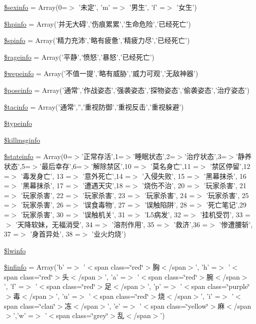 \begin{DoxyCompactItemize}
\item 
\hyperlink{resources__1_8php_a7fc213b5009edd4913f9a3f66776c721}{\$sexinfo} = Array(0=$>$ '未定', 'm' =$>$ '男生', 'f' =$>$ '女生')
\item 
\hyperlink{resources__1_8php_a6f91f38ee66d31d99255d9dc86032980}{\$hpinfo} = Array('并无大碍','伤痕累累','生命危险','已经死亡')
\item 
\hyperlink{resources__1_8php_a79b3890cc1a3fac35858fb155b285743}{\$spinfo} = Array('精力充沛','略有疲惫','精疲力尽','已经死亡')
\item 
\hyperlink{resources__1_8php_a5f383706ecfe4033fc5ba410b5efe3a0}{\$rageinfo} = Array('平静','愤怒','暴怒','已经死亡')
\item 
\hyperlink{resources__1_8php_a24d2c967a140f9ff99ba082c9353f696}{\$wepeinfo} = Array('不值一提','略有威胁','威力可观','无敌神器')
\item 
\hyperlink{resources__1_8php_af6cbbc5cff2f1db3093587d7495600ae}{\$poseinfo} = Array('通常','作战姿态','强袭姿态','探物姿态','偷袭姿态','治疗姿态')
\item 
\hyperlink{resources__1_8php_aed45c4ff2bc7ce0af6c4b05414cd1373}{\$tacinfo} = Array('通常','','重视防御','重视反击','重视躲避')
\item 
\hyperlink{resources__1_8php_afeaf726d0642146d7bf10c04e2c99075}{\$typeinfo}
\item 
\hyperlink{resources__1_8php_acfdab9efcdacf2869477a5e833712b40}{\$killmsginfo}
\item 
\hyperlink{resources__1_8php_a014f40ed69f3ce2bd7a3263f5b5c9d91}{\$stateinfo} = Array(0=$>$'正常存活',1=$>$'睡眠状态',2=$>$'治疗状态',3=$>$'静养状态',5=$>$'最后幸存',6=$>$'解除禁区',10 =$>$ '莫名身亡',11 =$>$ '禁区停留',12 =$>$ '毒发身亡', 13 =$>$ '意外死亡',14 =$>$ '入侵失败', 15 =$>$ '黑幕抹杀', 16 =$>$ '黑幕抹杀', 17 =$>$ '遭遇天灾',18 =$>$ '烧伤不治', 20 =$>$ '玩家杀害', 21 =$>$ '玩家杀害', 22 =$>$ '玩家杀害', 23 =$>$ '玩家杀害', 24 =$>$ '玩家杀害', 25 =$>$ '玩家杀害', 26 =$>$ '误食毒物', 27 =$>$ '误触陷阱', 28 =$>$ '死亡笔记',29 =$>$ '玩家杀害', 30 =$>$ '误触机关', 31 =$>$ 'L5病发', 32 =$>$ '挂机受罚', 33 =$>$ '天降软妹，无福消受', 34 =$>$ '溶剂作用', 35 =$>$ '救济',36 =$>$ '惨遭腰斩', 37 =$>$ '身首异处', 38 =$>$ '业火灼烧')
\item 
\hyperlink{resources__1_8php_a8bc9ffb8d571d6f8b62846c5ba0b9749}{\$lwinfo}
\item 
\hyperlink{resources__1_8php_a33e1d274ac0cd7ca76b5cc43833f5c1f}{\$infinfo} = Array('b' =$>$ '$<$span class=\char`\"{}red\char`\"{}$>$胸$<$/span$>$', 'h' =$>$ '$<$span class=\char`\"{}red\char`\"{}$>$头$<$/span$>$', 'a' =$>$ '$<$span class=\char`\"{}red\char`\"{}$>$腕$<$/span$>$', 'f' =$>$ '$<$span class=\char`\"{}red\char`\"{}$>$足$<$/span$>$', 'p' =$>$ '$<$span class=\char`\"{}purple\char`\"{}$>$毒$<$/span$>$', 'u' =$>$ '$<$span class=\char`\"{}red\char`\"{}$>$烧$<$/span$>$', 'i' =$>$ '$<$span class=\char`\"{}clan\char`\"{}$>$冻$<$/span$>$', 'e' =$>$ '$<$span class=\char`\"{}yellow\char`\"{}$>$麻$<$/span$>$','w' =$>$ '$<$span class=\char`\"{}grey\char`\"{}$>$乱$<$/span$>$')

\end{DoxyCompactItemize}
